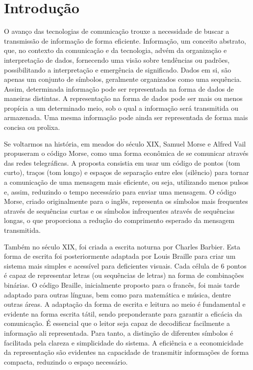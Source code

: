 \chapter{Introdução}

O avanço das tecnologias de comunicação trouxe a necessidade de buscar a
transmissão de informação de forma eficiente. Informação, um conceito abstrato,
que, no contexto da comunicação e da tecnologia, advém da organização e
interpretação de dados, fornecendo uma visão sobre tendências ou padrões,
possibilitando a interpretação e emergência de significado. Dados em si, são
apenas um conjunto de símbolos, geralmente organizados como uma sequência.
Assim, determinada informação pode ser representada na forma de dados de
maneiras distintas. A representação na forma de dados pode ser mais ou menos
propícia a um determinado meio, sob o qual a informação será transmitida ou
armazenada. Uma mesma informação pode ainda ser representada de forma mais
concisa ou prolixa.

Se voltarmos na história, em meados do século XIX, Samuel Morse e Alfred Vail
propuseram o código Morse, como uma forma econômica de se comunicar através das
redes telegráficas. A proposta consistia em usar um código de pontos (tom
curto), traços (tom longo) e espaços de separação entre eles (silêncio) para
tornar a comunicação de uma mensagem mais eficiente, ou seja, utilizando menos
pulsos e, assim, reduzindo o tempo necessário para enviar uma mensagem. O código Morse,
criado originalmente para o inglês, representa os símbolos mais frequentes através
de sequências curtas e os símbolos infrequentes através de sequências longas,
o que proporciona a redução do comprimento esperado da mensagem transmitida.

Também no século XIX, foi criada a escrita noturna por Charles Barbier. Esta
forma de escrita foi posteriormente adaptada por Louis Braille para criar um
sistema mais simples e acessível para deficientes visuais. Cada célula de 6
pontos é capaz de representar letras (ou sequências de letras) na forma de
combinações binárias. O código Braille, inicialmente proposto para o francês,
foi mais tarde adaptado para outras línguas, bem como para matemática e música,
dentre outras áreas. A adaptação da forma de escrita e leitura ao meio é
fundamental e evidente na forma escrita tátil, sendo preponderante para
garantir a eficácia da comunicação. É essencial que o leitor seja capaz de
decodificar facilmente a informação ali representada. Para tanto, a distinção
de diferentes símbolos é facilitada pela clareza e simplicidade do sistema. A
eficiência e a economicidade da representação são evidentes na capacidade de
transmitir informações de forma compacta, reduzindo o espaço necessário.

